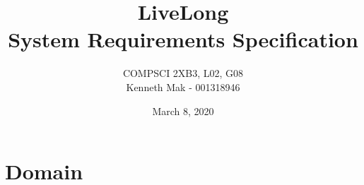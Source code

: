 \documentclass[12pt]{article}
\title{\textbf{LiveLong}\\System Requirements Specification}
\author{COMPSCI 2XB3, L02, G08\\Kenneth Mak - 001318946}
\date{March 8, 2020}
\begin{document}
\maketitle

\newpage
\tableofcontents

\newpage
\section{Domain}


\end{document}
